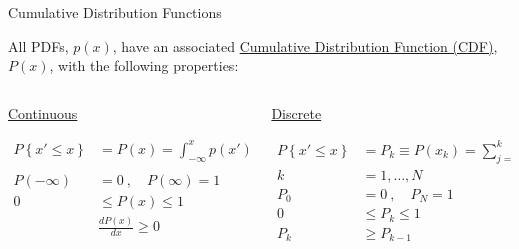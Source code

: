 \documentclass[xcolor=x11names,compress]{beamer}
\renewcommand{\(}{\begin{columns}}
\renewcommand{\)}{\end{columns}}
\newcommand{\<}[1]{\begin{column}{#1}}
\renewcommand{\>}{\end{column}}
\begin{document}
\begin{frame}{Cumulative Distribution Functions}

All PDFs, $p(x)$, have an associated \underline{Cumulative Distribution Function (CDF)}, $P(x)$, with the following properties:

\begin{columns}
  \begin{column}{0.5\textwidth}
    \begin{center}
    \textcolor{berkeleygold}{\underline{Continuous}} 
    \end{center}
    \begin{align*}
    P\left\lbrace x' \leq x \right\rbrace &= P(x) = \int_{-\infty}^x p(x')dx'\\
    & \\
    P(-\infty) &= 0 \:,\quad P(\infty) = 1 \\
    0 &\leq P(x) \leq 1 \\
    &\frac{dP(x)}{dx} \geq 0
    \end{align*}
  \end{column}
  \begin{column}{0.5\textwidth}
    \begin{center}
    \textcolor{berkeleyblue}{\underline{Discrete}}  
    \end{center}
    \begin{align*}
    P\left\lbrace x' \leq x \right\rbrace &= P_k \equiv P(x_k) = \sum_{j=1}^k p_j\\
    k &= 1, \dots, N \\
    P_0 &= 0 \:,\quad P_N = 1 \\
    0 &\leq P_k \leq 1 \\
    P_k & \geq P_{k-1} \\
    \end{align*}
  \end{column}
\end{columns}

\end{frame}
\end{document}
